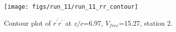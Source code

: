 \begin{figure}[H]
\centering
\texttt{[image: figs/run\_11/run\_11\_rr\_contour]}
\caption{Contour plot of $\overline{r^\prime r^\prime}$ at $z/c$=6.97, $V_{free}$=15.27, station 2.}
\label{fig:run_11_rr_contour}
\end{figure}


